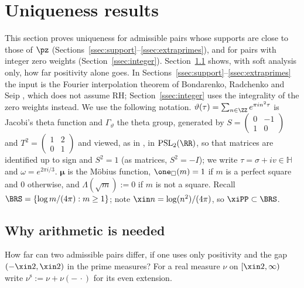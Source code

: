 \section{Uniqueness results}\label{sec:uniqueness}

\providecommand{\uqpmat}[4]{\left(\begin{smallmatrix}#1&#2\\#3&#4\end{smallmatrix}\right)}%
This section proves uniqueness for admissible pairs whose supports are close to those of $\pz$
(Sections~\ref{ssec:support}--\ref{ssec:extraprimes}), and for pairs with integer zero weights (Section~\ref{ssec:integer}).
Section~\ref{ssec:barrier} shows, with soft analysis only, how far positivity alone goes. In Sections~\ref{ssec:support}--\ref{ssec:extraprimes}
the input is the Fourier interpolation theorem of Bondarenko, Radchenko and Seip \cite{BRS}, which does not assume RH; Section~\ref{ssec:integer}
uses the integrality of the zero weights instead. We use the following notation.
$\vartheta(\tau)=\sum_{n\in\ZZ}e^{\pi in^2\tau}$ is Jacobi's theta function and $\Gamma_\vartheta$ the theta group, generated by
$S=\uqpmat{0}{-1}{1}{0}$ and $T^2=\uqpmat1201$ and viewed, as in \cite{BRS}, in $\mathrm{PSL}_2(\RR)$, so that matrices are identified up to
sign and $S^2=1$ (as matrices, $S^2=-I$); we write $\tau=\sigma+iv\in\mathbb H$ and $\omega=e^{2\pi i/3}$. $\boldsymbol\mu$ is the
M\"obius function, $\one_\square(m)=1$ if $m$ is a perfect square and $0$ otherwise, and $\Lambda(\sqrt m):=0$ if $m$ is not a square.
Recall $\BRS=\{\log m/(4\pi):m\ge1\}$; note $\xin n=\log(n^2)/(4\pi)$, so $\xiPP\subset\BRS$.

\subsection{Why arithmetic is needed}\label{ssec:barrier}

How far can two admissible pairs differ, if one uses only positivity and the gap $(-\xin2,\xin2)$ in the prime measures? For a real
measure $\nu$ on $[\xin2,\infty)$ write $\nu^{\mathrm s}:=\nu+\nu(-\,\cdot)$ for its even extension.

